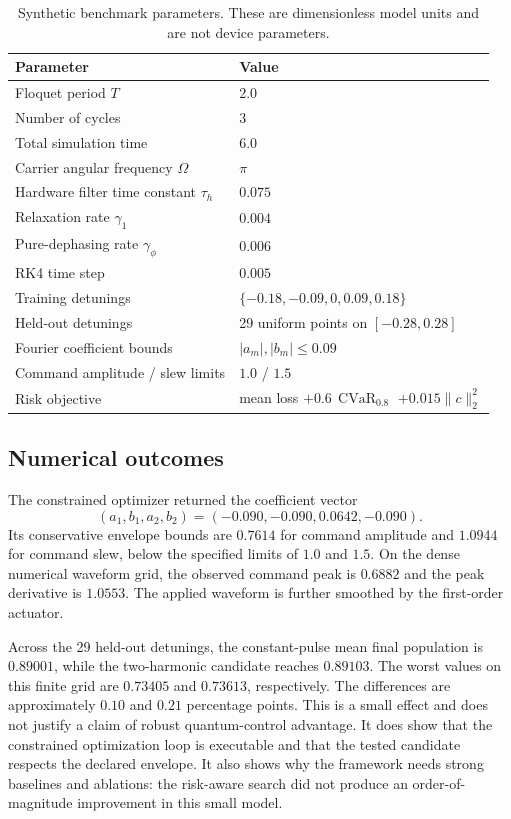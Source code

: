 \documentclass[10pt,twoside]{article}
\DeclareMathOperator{\CVaR}{CVaR}
\begin{document}
\begin{table}[t]
\centering\small
\caption{Synthetic benchmark parameters. These are dimensionless model units and are not device parameters.}
\label{tab:parameters}
\begin{tabular}{ll}
\toprule
Parameter & Value \\
\midrule
Floquet period $T$ & $2.0$ \\
Number of cycles & $3$ \\
Total simulation time & $6.0$ \\
Carrier angular frequency $\Omega$ & $\pi$ \\
Hardware filter time constant $\tau_h$ & $0.075$ \\
Relaxation rate $\gamma_1$ & $0.004$ \\
Pure-dephasing rate $\gamma_\phi$ & $0.006$ \\
RK4 time step & $0.005$ \\
Training detunings & $\{-0.18,-0.09,0,0.09,0.18\}$ \\
Held-out detunings & 29 uniform points on $[-0.28,0.28]$ \\
Fourier coefficient bounds & $|a_m|,|b_m|\leq0.09$ \\
Command amplitude / slew limits & $1.0$ / $1.5$ \\
Risk objective & mean loss $+0.6\,\CVaR_{0.8}$ $+0.015\|c\|_2^2$ \\
\bottomrule
\end{tabular}
\end{table}

\subsection{Numerical outcomes}

The constrained optimizer returned the coefficient vector
\begin{equation}
(a_1,b_1,a_2,b_2)=(-0.090,-0.090,0.0642,-0.090).
\end{equation}
Its conservative envelope bounds are $0.7614$ for command amplitude and $1.0944$ for command slew, below the specified limits of $1.0$ and $1.5$. On the dense numerical waveform grid, the observed command peak is $0.6882$ and the peak derivative is $1.0553$. The applied waveform is further smoothed by the first-order actuator.

Across the 29 held-out detunings, the constant-pulse mean final population is $0.89001$, while the two-harmonic candidate reaches $0.89103$. The worst values on this finite grid are $0.73405$ and $0.73613$, respectively. The differences are approximately $0.10$ and $0.21$ percentage points. This is a small effect and does not justify a claim of robust quantum-control advantage. It does show that the constrained optimization loop is executable and that the tested candidate respects the declared envelope. It also shows why the framework needs strong baselines and ablations: the risk-aware search did not produce an order-of-magnitude improvement in this small model.
\end{document}

